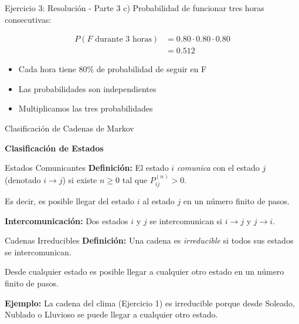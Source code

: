 \documentclass{beamer}
\begin{document}
\begin{frame}{Ejercicio 3: Resolución - Parte 3}
    c) Probabilidad de funcionar tres horas consecutivas:
    
    \[
    \begin{split}
    P(F \text{ durante 3 horas}) &= 0.80 \cdot 0.80 \cdot 0.80 \\
    &= 0.512
    \end{split}
    \]
    
    \begin{itemize}
        \item Cada hora tiene 80\% de probabilidad de seguir en F
        \item Las probabilidades son independientes
        \item Multiplicamos las tres probabilidades
    \end{itemize}
\end{frame}


\begin{frame}{Clasificación de Cadenas de Markov}
    \begin{center}
        \Large{\textbf{Clasificación de Estados}}
    \end{center}
\end{frame}

\begin{frame}{Estados Comunicantes}
    \small
    \textbf{Definición:} El estado $i$ \textit{comunica} con el estado $j$ (denotado $i \rightarrow j$) si existe $n \geq 0$ tal que $P_{ij}^{(n)} > 0$.

    \vspace{0.5em}

    Es decir, es posible llegar del estado $i$ al estado $j$ en un número finito de pasos.

    \vspace{1em}

    \textbf{Intercomunicación:} Dos estados $i$ y $j$ se intercomunican si $i \rightarrow j$ y $j \rightarrow i$.
\end{frame}

\begin{frame}{Cadenas Irreducibles}
    \small
    \textbf{Definición:} Una cadena es \textit{irreducible} si todos sus estados se intercomunican.

    \vspace{0.5em}

    Desde cualquier estado es posible llegar a cualquier otro estado en un número finito de pasos.

    \vspace{1em}

    \textbf{Ejemplo:} La cadena del clima (Ejercicio 1) es irreducible porque desde Soleado, Nublado o Lluvioso se puede llegar a cualquier otro estado.
\end{frame}
\end{document}
